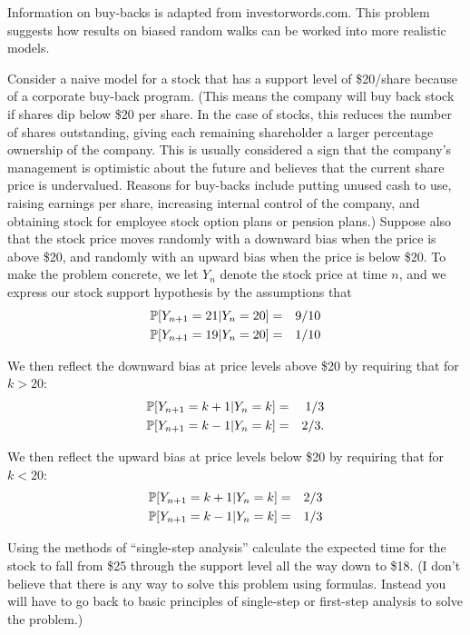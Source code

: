 


\begin{problem}
  Information on buy-backs is adapted from investorwords.com.
  This problem suggests how results on biased random walks
  can be worked into more realistic models.

  Consider a naive model for a stock that has a support level
  of \$20/share because of a corporate buy-back program.
  (This means the company will buy back stock if shares dip
  below \$20 per share.   In the case of stocks, this reduces
  the number of shares outstanding, giving each remaining
  shareholder a larger percentage ownership of the
  company. This is usually considered a sign that the
  company's management is optimistic about the future and
  believes that the current share price is
  undervalued. Reasons for buy-backs include putting unused
  cash to use, raising earnings per share, increasing internal
  control of the company, and obtaining stock for employee
  stock option plans or pension plans.)   Suppose also that the
  stock price moves randomly with a downward bias when the
  price is above \$20, and randomly with an upward bias when
  the price is below \$20.  To make the problem concrete, we
  let $Y_n$ denote the stock price at time $n$, and we express
  our stock support hypothesis by the assumptions that
  \begin{eqnarray*}
   \P[ Y_{n+1} = 21 | Y_{n} = 20] &=& 9/10 \\
   \P[ Y_{n+1} = 19 | Y_{n} = 20] &=& 1/10
  \end{eqnarray*}

  We then reflect the downward bias at price levels above
  \$20 by requiring that for $k > 20$:
  \begin{eqnarray*}
   \P[ Y_{n+1} = k+1 | Y_{n} = k ] &=& 1/3 \\
   \P[ Y_{n+1} = k-1 | Y_{n} = k ] &=& 2/3.
  \end{eqnarray*}

  We then reflect the upward bias at price levels below \$20
  by requiring that for $k < 20$:
  \begin{eqnarray*}
   \P[ Y_{n+1} = k+1 | Y_{n} = k ] &=& 2/3 \\
   \P[ Y_{n+1} = k-1 | Y_{n} = k ] &=& 1/3
  \end{eqnarray*}

  Using the methods of ``single-step analysis'' calculate the
  expected time for the stock to fall from \$25 through the
  support level all the way down to \$18.
  (I don't believe that there is any way to solve this problem
  using formulas.  Instead you will have to go back to basic
  principles of single-step or first-step analysis to solve
  the problem.)


\end{problem}
